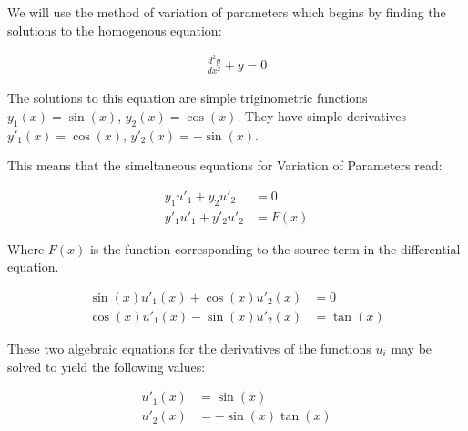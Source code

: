 \documentclass[paper=a4, fontsize=11pt]{scrartcl} %
\numberwithin{equation}{section} %
\numberwithin{figure}{section} %
\numberwithin{table}{section} %
\begin{document}
We will use the method of variation of parameters which begins by finding the solutions to the homogenous equation:

\begin{align}
\frac{d^2 y}{dx^2} + y = 0
\end{align}

The solutions to this equation are simple triginometric functions $y_1(x) = \sin(x)$, $y_2(x) = \cos(x)$. They have simple derivatives $y'_1(x) = \cos(x)$, $y'_2(x) = -\sin(x)$.

\hspace{2mm}

This means that the simeltaneous equations for Variation of Parameters read:

\begin{align}
y_1 u'_1 + y_2 u'_2 &= 0 \\
y'_1 u'_1 + y'_2 u'_2 &= F(x)
\end{align}

Where $F(x)$ is the function corresponding to the source term in the differential equation.

\begin{align}
\sin(x)u'_1(x) + \cos(x)u'_2(x) &= 0 \\
\cos(x)u'_1(x) - \sin(x)u'_2(x) &= \tan(x)
\end{align}






These two algebraic equations for the derivatives of the functions $u_i$ may be solved to yield the following values:

\begin{align}
u'_1(x) &= \sin(x) \\
u'_2(x) &= -\sin(x)\tan(x)
\end{align}
\end{document}
